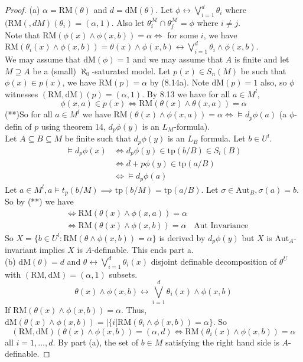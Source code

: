 \documentclass[letterpaper, 12pt]{article}
\newcommand{\cM}{\mathcal{M}}
\newcommand{\Aut}{\mbox{Aut}}
\newcommand{\tp}{\mbox{tp}}
\newcommand{\RM}{\mbox{RM}}
\newcommand{\dM}{\mbox{dM}}
\theoremstyle{stdthm}
\theoremstyle{stddef}
\theoremstyle{stdnonum}
\theoremstyle{stdqands}
\theoremstyle{stdbold}
\begin{document}
\begin{proof}
(a) $\alpha = \RM(\theta)$ and $d = \dM(\theta)$. Let $\phi \leftrightarrow \bigvee_{i=1}^d \theta_i$ where $(\RM(,dM)(\theta_i) = (\alpha,1)$. Also let $\theta_i^\cM \cap \theta_j^\cM = \phi$ where $i\neq j$. \\

Note that $\RM(\phi(x) \wedge \phi(x,b)) = \alpha \iff $ for some $i$, we have $\RM(\theta_i(x) \wedge \phi(x,b)) = \theta(x)\wedge\phi(x,b) \leftrightarrow \bigvee_{i=1}^d \theta_i \wedge \phi(x,b)$. \\

We may assume that $\dM(\phi) = 1$ and we may assume that $A$ is finite and let $M \supseteq A$ be a (small) $\aleph_0$-saturated model. Let $p(x) \in S_n(M)$ be such that $\phi(x) \in p(x)$, we have $\RM(p) = \alpha$ by (8.14a). Note $\dM(p) = 1$ also, so $\phi$ witnesses $(\RM,\dM)(p) = (\alpha,1)$. By 8.13 we have for all $a \in M^l$, 
\[ \phi(x,a) \in p(x) \iff \RM(\theta(x) \wedge \theta(x,a)) = \alpha \]
(**)So for all $a \in M^l$ we have $\RM(\theta(x) \wedge \phi(x,a)) = \alpha \iff \models d_p \phi(a)$ (a $\phi$-defin of $p$ using theorem 14, $d_p \phi(y)$ is an $L_M$-formula). \\

Let $A \subseteq B \subseteq M$ be finite such that $d_p\phi(y)$ is an $L_B$ formula. Let $b \in U^l$. 
\begin{align*}
\models d_p \phi(x) &\iff d_p \phi(y) \in \tp(b/B) \in S_l(B) \\
& \iff d+p \phi(y) \in \tp(a/B) \\
&\iff \models d_p \phi(a)
\end{align*}
 Let $a \in M^l, a\models t_p(b/M)\implies \tp(b/M) = \tp(a/B)$. Let $\sigma \in \Aut_B, \sigma(a) = b$. So by (**) we have
 \begin{align*}
 &\iff \RM(\theta(x) \wedge \phi(x,a)) = \alpha \\
 & \iff \RM(\theta(x) \wedge \phi(x,b)) = \alpha  &\text{Aut Invariance}
 \end{align*}
So $X = \{b \in U^l:\RM(\theta \wedge \phi(x,b)) = \alpha\}$ is derived by $d_p \phi(y)$ but $X$ is $\Aut_A$-invariant implies $X$ is $A$-definable. This ends part a. \\

(b) $\dM(\theta) = d$ and $\theta \leftrightarrow \bigvee_{i=1}^d \theta_i (x)$ disjoint definable decomposition of $\theta^U$ with $(\RM,\dM) = (\alpha,1)$ subsets. 
\[ \theta(x) \wedge \phi(x,b) \leftrightarrow \bigvee_{i=1}^d \theta_i(x) \wedge \phi(x,b) \]
If $\RM(\theta(x) \wedge \phi(x,b)) = \alpha$. Thus, $\dM(\theta(x) \wedge \phi(x,b)) = | \{ i| \RM(\theta_i \wedge \phi(x,b)) = \alpha\}$. So 
\[ (\RM,\dM)(\theta(x) \wedge \phi(x,b)) = (\alpha,d) \iff \RM(\theta_i(x) \wedge \phi(x,b)) = \alpha \]
all $i =1,\dots,d$. By part (a), the set of $b \in M$ satisfying the right hand side is $A$-definable. 
\end{proof}
\end{document}
